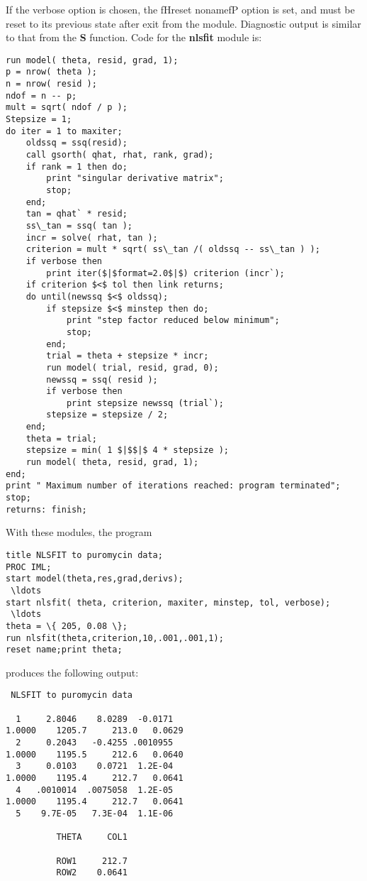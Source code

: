 {If the verbose option is chosen, the fHreset nonamefP option
is set, and must be reset to its previous state after exit from the
module.  Diagnostic output is similar to that from the
{\bf S} function.  Code for the {\bf nlsfit} module is:
\begin{verbatim}
run model( theta, resid, grad, 1);
p = nrow( theta );
n = nrow( resid );
ndof = n -- p;
mult = sqrt( ndof / p );
Stepsize = 1;
do iter = 1 to maxiter;
    oldssq = ssq(resid);
    call gsorth( qhat, rhat, rank, grad);
    if rank = 1 then do;
        print "singular derivative matrix";
        stop;
    end;
    tan = qhat` * resid;
    ss\_tan = ssq( tan );
    incr = solve( rhat, tan );
    criterion = mult * sqrt( ss\_tan /( oldssq -- ss\_tan ) );
    if verbose then
        print iter($|$format=2.0$|$) criterion (incr`);
    if criterion $<$ tol then link returns;
    do until(newssq $<$ oldssq);
        if stepsize $<$ minstep then do;
            print "step factor reduced below minimum";
            stop;
        end;
        trial = theta + stepsize * incr;
        run model( trial, resid, grad, 0);
        newssq = ssq( resid );
        if verbose then
            print stepsize newssq (trial`);
        stepsize = stepsize / 2;
    end;
    theta = trial;
    stepsize = min( 1 $|$$|$ 4 * stepsize );
    run model( theta, resid, grad, 1);
end;
print " Maximum number of iterations reached: program terminated";
stop;
returns: finish;
\end{verbatim}

With these modules, the program
\begin{verbatim}
title NLSFIT to puromycin data;
PROC IML;
start model(theta,res,grad,derivs);
 \ldots
start nlsfit( theta, criterion, maxiter, minstep, tol, verbose);
 \ldots
theta = \{ 205, 0.08 \};
run nlsfit(theta,criterion,10,.001,.001,1);
reset name;print theta;
\end{verbatim}

produces the following output:
\begin{verbatim}
 NLSFIT to puromycin data
 
  1     2.8046    8.0289  -0.0171
1.0000    1205.7     213.0   0.0629
  2     0.2043   -0.4255 .0010955
1.0000    1195.5     212.6   0.0640
  3     0.0103    0.0721  1.2E-04
1.0000    1195.4     212.7   0.0641
  4   .0010014  .0075058  1.2E-05
1.0000    1195.4     212.7   0.0641
  5    9.7E-05   7.3E-04  1.1E-06
 
          THETA     COL1
 
          ROW1     212.7
          ROW2    0.0641
\end{verbatim}

}
